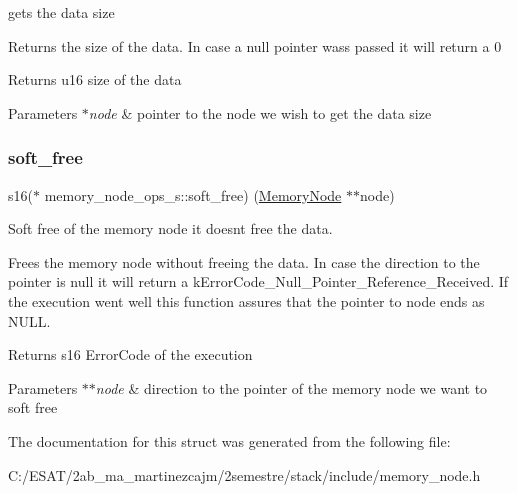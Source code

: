 gets the data size 

Returns the size of the data. In case a null pointer wass passed it will return a 0

\begin{DoxyReturn}{Returns}
u16 size of the data 
\end{DoxyReturn}

\begin{DoxyParams}{Parameters}
{\em $\ast$node} & pointer to the node we wish to get the data size \\
\hline
\end{DoxyParams}
\mbox{\label{structmemory__node__ops__s_a51993e6d5aeb1025181ba5ae46e9f0a8}} 
\subsubsection{\texorpdfstring{soft\+\_\+free}{soft\_free}}
{\footnotesize\ttfamily s16($\ast$ memory\+\_\+node\+\_\+ops\+\_\+s\+::soft\+\_\+free) (\hyperlink{structmemory__node__s}{Memory\+Node} $\ast$$\ast$node)}



Soft free of the memory node it doesn\textquotesingle{}t free the data. 

Frees the memory node without freeing the data. In case the direction to the pointer is null it will return a k\+Error\+Code\+\_\+\+Null\+\_\+\+Pointer\+\_\+\+Reference\+\_\+\+Received. If the execution went well this function assures that the pointer to node ends as N\+U\+LL.

\begin{DoxyReturn}{Returns}
s16 Error\+Code of the execution 
\end{DoxyReturn}

\begin{DoxyParams}{Parameters}
{\em $\ast$$\ast$node} & direction to the pointer of the memory node we want to soft free \\
\hline
\end{DoxyParams}


The documentation for this struct was generated from the following file\+:\begin{DoxyCompactItemize}
\item 
C\+:/\+E\+S\+A\+T/2ab\+\_\+ma\+\_\+martinezcajm/2semestre/stack/include/memory\+\_\+node.\+h\end{DoxyCompactItemize}
